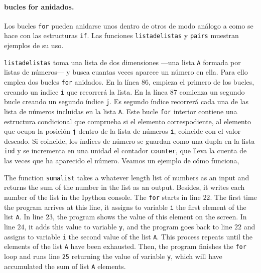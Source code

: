 \begin{paracol}{2}
\paragraph{bucles for anidados.}  Los bucles \texttt{for} pueden anidarse unos dentro de otros de modo análogo a como se hace con las estructuras \texttt{if}. Las funciones \texttt{listadelistas} y \texttt{pairs} muestran ejemplos de su uso.

\texttt{listadelistas} toma una lista de dos dimensiones ---una lista \texttt{A} formada por listas de números--- y busca cuantas veces aparece un número en ella. Para ello emplea dos bucles \texttt{for} anidados. En la línea $86$, empieza el primero de los bucles, creando un índice \texttt{i} que recorrerá la lista. En la línea $87$ comienza un segundo bucle creando un segundo índice \texttt{j}. Es segundo índice recorrerá cada una de las lista de números incluidas en la lista \texttt{A}. Este bucle \texttt{for} interior contiene una estructura condicional que comprueba si el elemento correspodiente, al elemento que ocupa la posición \texttt{j} dentro de la lista de números \texttt{i}, coincide con el valor deseado. Si coincide, los índices de número se guardan como una dupla en la lista \texttt{ind} y se incrementa en una unidad el contador \texttt{counter}, que lleva la cuenta de las veces que ha aparecido el número. Veamos un ejemplo de cómo funciona,

\switchcolumn

The function \texttt{sumalist} takes a whatever length list of numbers as an input and returns the sum of the number in the list as an output. Besides, it writes each number of the list in the Ipython console. The \texttt{for} starts in line $22$. The first time the program arrives at this line, it assigns to variable \texttt{i} the first element of the list \texttt{A}. In line $23$, the program shows the value of this element on the screen. In line $24$, it adds this value to variable \texttt{y}, and the program goes back to line $22$ and assigns to variable \texttt{i} the second value of the list \texttt{A}. This process repeats until the elements of the list \texttt{A} have been exhausted. Then, the program finishes the \texttt{for} loop and runs line \texttt{25} returning the value of variable \texttt{y}, which will have accumulated the sum of list \texttt{A} elements.


\end{paracol}
